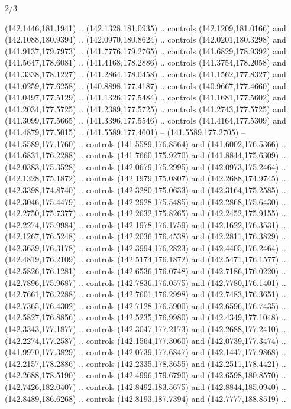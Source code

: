 \begin{flagdescription}{2/3}
\begin{scope}[shift={(0.5\flaglength,0.5)},scale=\flagwidth/320]
\begin{scope}[y=0.8pt, x=0.8pt, yscale=-1,shift={(-118.3,-146)}]
  (142.1446,181.1941) .. (142.1328,181.0935) .. controls (142.1209,181.0166) and
  (142.1088,180.9394) .. (142.0970,180.8624) .. controls (142.0201,180.3298) and
  (141.9137,179.7973) .. (141.7776,179.2765) .. controls (141.6829,178.9392) and
  (141.5647,178.6081) .. (141.4168,178.2886) .. controls (141.3754,178.2058) and
  (141.3338,178.1227) .. (141.2864,178.0458) .. controls (141.1562,177.8327) and
  (141.0259,177.6258) .. (140.8898,177.4187) .. controls (140.9667,177.4660) and
  (141.0497,177.5129) .. (141.1326,177.5484) .. controls (141.1681,177.5602) and
  (141.2034,177.5725) .. (141.2389,177.5725) .. controls (141.2743,177.5725) and
  (141.3099,177.5665) .. (141.3396,177.5546) .. controls (141.4164,177.5309) and
  (141.4879,177.5015) .. (141.5589,177.4601) -- (141.5589,177.2705) --
  (141.5589,177.1760) .. controls (141.5589,176.8564) and (141.6002,176.5366) ..
  (141.6831,176.2288) .. controls (141.7660,175.9270) and (141.8844,175.6309) ..
  (142.0383,175.3528) .. controls (142.0679,175.2995) and (142.0973,175.2464) ..
  (142.1328,175.1872) .. controls (142.1979,175.0807) and (142.2688,174.9745) ..
  (142.3398,174.8740) .. controls (142.3280,175.0633) and (142.3164,175.2585) ..
  (142.3046,175.4479) .. controls (142.2928,175.5485) and (142.2868,175.6430) ..
  (142.2750,175.7377) .. controls (142.2632,175.8265) and (142.2452,175.9155) ..
  (142.2274,175.9984) .. controls (142.1978,176.1759) and (142.1622,176.3531) ..
  (142.1267,176.5248) .. controls (142.2036,176.4538) and (142.2811,176.3829) ..
  (142.3639,176.3178) .. controls (142.3994,176.2823) and (142.4405,176.2464) ..
  (142.4819,176.2109) .. controls (142.5174,176.1872) and (142.5471,176.1577) ..
  (142.5826,176.1281) .. controls (142.6536,176.0748) and (142.7186,176.0220) ..
  (142.7896,175.9687) .. controls (142.7836,176.0575) and (142.7780,176.1401) ..
  (142.7661,176.2288) .. controls (142.7601,176.2998) and (142.7483,176.3651) ..
  (142.7365,176.4302) .. controls (142.7128,176.5900) and (142.6596,176.7435) ..
  (142.5827,176.8856) .. controls (142.5235,176.9980) and (142.4349,177.1048) ..
  (142.3343,177.1877) .. controls (142.3047,177.2173) and (142.2688,177.2410) ..
  (142.2274,177.2587) .. controls (142.1564,177.3060) and (142.0739,177.3474) ..
  (141.9970,177.3829) .. controls (142.0739,177.6847) and (142.1447,177.9868) ..
  (142.2157,178.2886) .. controls (142.2335,178.3655) and (142.2511,178.4421) ..
  (142.2688,178.5190) .. controls (142.4996,179.6790) and (142.6598,180.8570) ..
  (142.7426,182.0407) .. controls (142.8492,183.5675) and (142.8844,185.0940) ..
  (142.8489,186.6268) .. controls (142.8193,187.7394) and (142.7777,188.8519) ..

\end{scope}
\end{scope}
\end{flagdescription}
